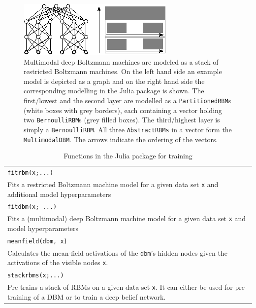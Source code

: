 \documentclass[12pt]{article}
\newcommand{\inlinecode}[1]{\texttt{#1}}
\begin{document}
\begin{figure}[h]
   \centering
   \includegraphics[scale=3.]{images/MDBMImpl.eps}
   \caption{Multimodal deep Boltzmann machines are modeled as a stack of restricted Boltzmann machines. On the left hand side an example model is depicted as a graph and on the right hand side the corresponding modelling in the Julia package is shown.
   The first/lowest and the second layer are modelled as a \inlinecode{PartitionedRBM}s (white boxes with grey borders), each containing a vector holding two \inlinecode{BernoulliRBM}s (grey filled boxes).
   The third/highest layer is simply a \inlinecode{BernoulliRBM}.
   All three \inlinecode{AbstractRBMs} in a vector form the \inlinecode{MultimodalDBM}.
   The arrows indicate the ordering of the vectors.}
\label{mdbmimplasstack}
\end{figure}


\begin{table}
\begin{tabularx}{\textwidth}{X}
   \hline
   \inlinecode{fitrbm(x;...)} \\
   Fits a restricted Boltzmann machine model for a given data set \inlinecode{x} and additional model hyperparameters \\
   \inlinecode{fitdbm(x; ...)} \\
   Fits a (multimodal) deep Boltzmann machine model for a given data set \inlinecode{x} and model hyperparameters \\
   \inlinecode{meanfield(dbm, x)} \\
   Calculates the mean-field activations of the \inlinecode{dbm}'s hidden nodes given the activations of the visible nodes \inlinecode{x}. \\
   \inlinecode{stackrbms(x;...)} \\
   Pre-trains a stack of RBMs on a given data set \inlinecode{x}. It can either be used for pre-training of a DBM or to train a deep belief network. \\
   \hline
\end{tabularx}
\caption{Functions in the Julia package for training}\label{juliaFunTableTrain}
\end{table}
\end{document}
